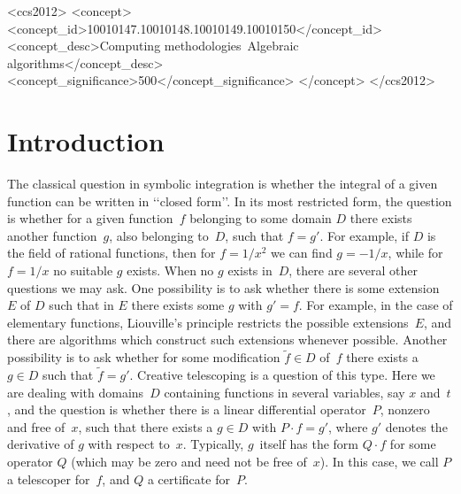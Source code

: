 \documentclass{sig-alternate-05-2015}
\begin{document}
\begin{CCSXML}
<ccs2012>
<concept>
<concept_id>10010147.10010148.10010149.10010150</concept_id>
<concept_desc>Computing methodologies~Algebraic algorithms</concept_desc>
<concept_significance>500</concept_significance>
</concept>
</ccs2012>
\end{CCSXML}






\section{Introduction}\label{SECT:intro}

The classical question in symbolic integration is whether the integral of
a given function can be written in \lq\lq closed form\rq\rq. In its most restricted form,
the question is whether for a given function~$f$ belonging to some domain $D$
there exists another function~$g$, also belonging to~$D$, such that $f=g'$. For
example, if $D$ is the field of rational functions, then for $f=1/x^2$ we can
find $g=-1/x$, while for $f=1/x$ no suitable $g$ exists. When no $g$ exists
in~$D$, there are several other questions we may ask. One possibility is to ask
whether there is some extension~$E$ of $D$ such that in $E$ there exists some
$g$ with $g'=f$. For example, in the case of elementary functions, Liouville's
principle restricts the possible extensions~$E$, and there are algorithms which
construct such extensions whenever possible. Another possibility is
to ask whether for some modification $\tilde f\in D$ of~$f$ there exists a $g\in
D$ such that $\tilde f=g'$. Creative telescoping is a question of this
type. Here we are dealing with domains~$D$ containing functions in several
variables, say $x$ and~$t$, and the question is whether there is a linear
differential operator~$P$, nonzero and free of~$x$, such that there exists a
$g\in D$ with $P\cdot f=g'$, where $g'$ denotes the derivative of $g$ with
respect to~$x$. Typically, $g$~itself has the form $Q\cdot f$ for some operator
$Q$ (which may be zero and need not be free of~$x$). In this case, we call $P$
a telescoper for~$f$, and $Q$ a certificate for~$P$.
\end{document}
